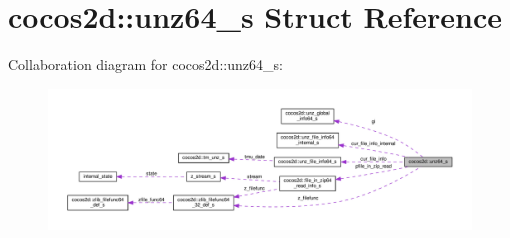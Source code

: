 \hypertarget{structcocos2d_1_1unz64__s}{}\section{cocos2d\+:\+:unz64\+\_\+s Struct Reference}
\label{structcocos2d_1_1unz64__s}


Collaboration diagram for cocos2d\+:\+:unz64\+\_\+s\+:
\nopagebreak
\begin{figure}[H]
\begin{center}
\leavevmode
\includegraphics[width=350pt]{structcocos2d_1_1unz64__s__coll__graph}
\end{center}
\end{figure}
